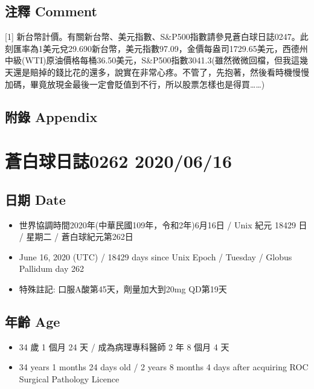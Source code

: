 \documentclass[
]{article}
\providecommand{\tightlist}{%
  \setlength{\itemsep}{0pt}\setlength{\parskip}{0pt}}
\begin{document}
\hypertarget{ux6ce8ux91cb-comment-12}{%
\subsection{注釋 Comment}\label{ux6ce8ux91cb-comment-12}}

{[}1{]}
新台幣計價。有關新台幣、美元指數、S\&P500指數請參見蒼白球日誌0247。此刻匯率為1美元兌29.690新台幣，美元指數97.09，金價每盎司1729.65美元，西德州中級(WTI)原油價格每桶36.50美元，S\&P500指數3041.3(雖然微微回檔，但我這幾天還是賠掉的錢比花的還多，說實在非常心疼。不管了，先抱著，然後看時機慢慢加碼，畢竟放現金最後一定會貶值到不行，所以股票怎樣也是得買\ldots\ldots)

\hypertarget{ux9644ux9304-appendix-12}{%
\subsection{附錄 Appendix}\label{ux9644ux9304-appendix-12}}

\hypertarget{ux84bcux767dux7403ux65e5ux8a8c0262-20200616}{%
\section{蒼白球日誌0262
2020/06/16}\label{ux84bcux767dux7403ux65e5ux8a8c0262-20200616}}

\hypertarget{ux65e5ux671f-date-13}{%
\subsection{日期 Date}\label{ux65e5ux671f-date-13}}

\begin{itemize}
\tightlist
\item
  世界協調時間2020年(中華民國109年，令和2年)6月16日 / Unix 紀元 18429 日
  / 星期二 / 蒼白球紀元第262日
\item
  June 16, 2020 (UTC) / 18429 days since Unix Epoch / Tuesday / Globus
  Pallidum day 262
\item
  特殊註記: 口服A酸第45天，劑量加大到20mg QD第19天
\end{itemize}

\hypertarget{ux5e74ux9f61-age-13}{%
\subsection{年齡 Age}\label{ux5e74ux9f61-age-13}}

\begin{itemize}
\tightlist
\item
  34 歲 1 個月 24 天 / 成為病理專科醫師 2 年 8 個月 4 天
\item
  34 years 1 months 24 days old / 2 years 8 months 4 days after
  acquiring ROC Surgical Pathology Licence
\end{itemize}
\end{document}
